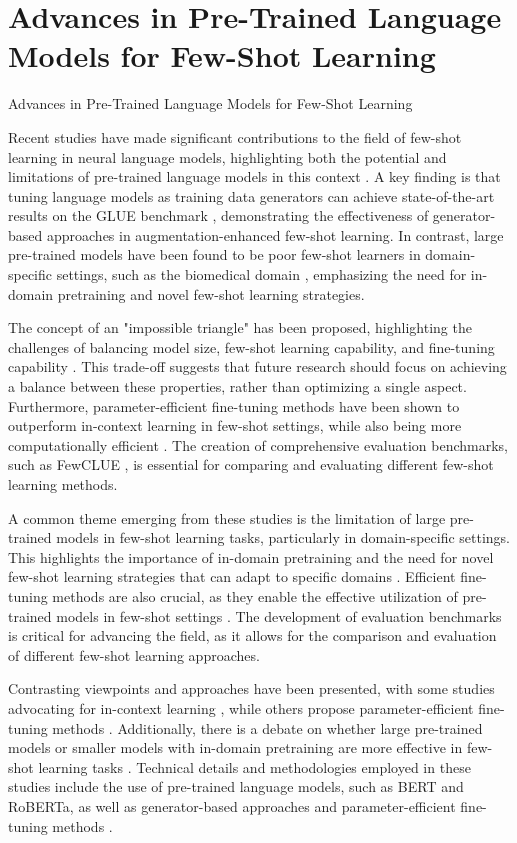 \documentclass[conference]{IEEEtran}
\begin{document}
\section{Advances in Pre-Trained Language Models for Few-Shot Learning}
Advances in Pre-Trained Language Models for Few-Shot Learning

Recent studies have made significant contributions to the field of few-shot learning in neural language models, highlighting both the potential and limitations of pre-trained language models in this context \cite{b1}. A key finding is that tuning language models as training data generators can achieve state-of-the-art results on the GLUE benchmark \cite{b2}, demonstrating the effectiveness of generator-based approaches in augmentation-enhanced few-shot learning. In contrast, large pre-trained models have been found to be poor few-shot learners in domain-specific settings, such as the biomedical domain \cite{b3}, emphasizing the need for in-domain pretraining and novel few-shot learning strategies.

The concept of an "impossible triangle" has been proposed, highlighting the challenges of balancing model size, few-shot learning capability, and fine-tuning capability \cite{b4}. This trade-off suggests that future research should focus on achieving a balance between these properties, rather than optimizing a single aspect. Furthermore, parameter-efficient fine-tuning methods have been shown to outperform in-context learning in few-shot settings, while also being more computationally efficient \cite{b5}. The creation of comprehensive evaluation benchmarks, such as FewCLUE \cite{b6}, is essential for comparing and evaluating different few-shot learning methods.

A common theme emerging from these studies is the limitation of large pre-trained models in few-shot learning tasks, particularly in domain-specific settings. This highlights the importance of in-domain pretraining and the need for novel few-shot learning strategies that can adapt to specific domains \cite{b3}. Efficient fine-tuning methods are also crucial, as they enable the effective utilization of pre-trained models in few-shot settings \cite{b5}. The development of evaluation benchmarks is critical for advancing the field, as it allows for the comparison and evaluation of different few-shot learning approaches.

Contrasting viewpoints and approaches have been presented, with some studies advocating for in-context learning \cite{b7}, while others propose parameter-efficient fine-tuning methods \cite{b5}. Additionally, there is a debate on whether large pre-trained models or smaller models with in-domain pretraining are more effective in few-shot learning tasks \cite{b3}. Technical details and methodologies employed in these studies include the use of pre-trained language models, such as BERT and RoBERTa, as well as generator-based approaches and parameter-efficient fine-tuning methods \cite{b2} \cite{b5}.
\end{document}
